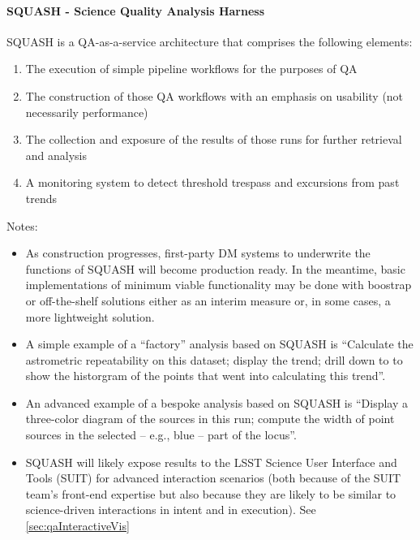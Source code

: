 \paragraph{SQUASH - Science Quality Analysis Harness}
\label{sec:qaSquash}

SQUASH is a QA-as-a-service architecture that comprises the following elements:

\begin{enumerate}

\item The execution of simple pipeline workflows for the purposes of QA

\item The construction of those QA workflows with an emphasis on usability (not necessarily performance)

\item The collection and exposure of the results of those runs for further retrieval and analysis

\item A monitoring system to detect threshold trespass and excursions from past trends

\end{enumerate}

Notes:

\begin{itemize}

\item As construction progresses, first-party DM systems to underwrite the functions of SQUASH will become production ready. In the meantime, basic implementations of minimum viable functionality may be done with boostrap or off-the-shelf solutions either as an interim measure or, in some cases, a more lightweight solution.

\item A simple example of a ``factory'' analysis based on SQUASH is ``Calculate the astrometric repeatability on this dataset; display the trend; drill down to to show the historgram of the points that went into calculating this trend''.

\item An advanced example of a bespoke analysis based on SQUASH is ``Display a three-color diagram of the sources in this run; compute the width of point sources in the selected -- e.g., blue -- part of the locus''.

\item SQUASH will likely expose results to the LSST Science User Interface and Tools (SUIT) for advanced interaction scenarios (both because of the SUIT team's front-end expertise but also because they are likely to be similar to science-driven interactions in intent and in execution). See \ref{sec:qaInteractiveVis}

\end{itemize}

